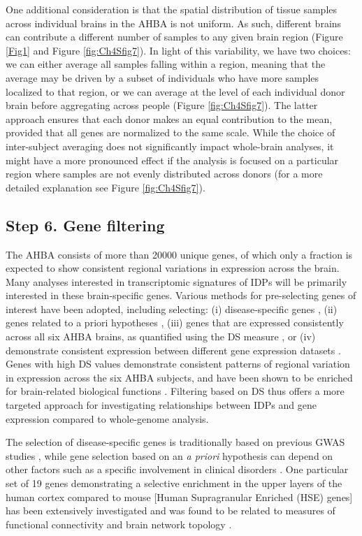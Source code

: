 \documentclass[10pt,A4]{article}
\begin{document}
One additional consideration is that the spatial distribution of tissue samples across individual brains in the AHBA is not uniform. As such, different brains can contribute a different number of samples to any given brain region (Figure \ref{Fig1} and Figure \ref{fig:Ch4Sfig7}). In light of this variability, we have two choices: we can either average all samples falling within a region, meaning that the average may be driven by a subset of individuals who have more samples localized to that region, or we can average at the level of each individual donor brain before aggregating across people (Figure \ref{fig:Ch4Sfig7}). The latter approach ensures that each donor makes an equal contribution to the mean, provided that all genes are normalized to the same scale. While the choice of inter-subject averaging does not significantly impact whole-brain analyses, it might have a more pronounced effect if the analysis is focused on a particular region where samples are not evenly distributed across donors (for a more detailed explanation see Figure \ref{fig:Ch4Sfig7}).

\subsection*{Step 6. Gene filtering}

The AHBA consists of more than \num{20000} unique genes, of which only a fraction is expected to show consistent regional variations in expression across the brain. Many analyses interested in transcriptomic signatures of IDPs will be primarily interested in these brain-specific genes. Various methods for pre-selecting genes of interest have been adopted, including selecting: (i) disease-specific genes \citep{Rittman2016,Romme2017,Yokoyama2017a}, (ii) genes related to a priori hypotheses \citep{Goyal2014,Komorowski2016,Krienen2016,Acevedo-Triana2017}, (iii) genes that are expressed consistently across all six AHBA brains, as quantified using the DS measure \citep{Hawrylycz2015}, or (iv) demonstrate consistent expression between different gene expression datasets \citep{Shin2018}. Genes with high DS values demonstrate consistent patterns of regional variation in expression across the six AHBA subjects, and have been shown to be enriched for brain-related biological functions \citep{Hawrylycz2015}. Filtering based on DS thus offers a more targeted approach for investigating relationships between IDPs and gene expression compared to whole-genome analysis.

The selection of disease-specific genes is traditionally based on previous GWAS studies \citep{Satake2009,Simon-Sanchez2009,Hoglinger2011,Ferrari2014,Ripke2014a,Kouri2015}, while gene selection based on an \textit{a priori} hypothesis can depend on other factors such as a specific involvement in clinical disorders \citep{Komorowski2016,Acevedo-Triana2017}. One particular set of 19 genes demonstrating a selective enrichment in the upper layers of the human cortex compared to mouse [Human Supragranular Enriched (HSE) genes] has been extensively investigated and was found to be related to measures of functional connectivity \citep{Krienen2016} and brain network topology \citep{Vertes2016b,Romero-Garcia2018}.
\end{document}
